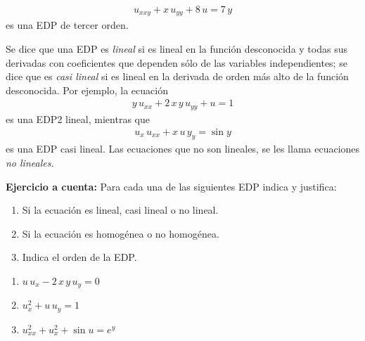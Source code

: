 \begin{align*}
u_{x x y} + x \, u_{y y} + 8 \, u = 7 \, y
\end{align*}
es una EDP de tercer orden.
\par
Se dice que una EDP es \emph{lineal} si es lineal en la función desconocida y todas sus derivadas con coeficientes que dependen sólo de las variables independientes; se dice que es \emph{casi lineal} si es lineal en la derivada de orden más alto de la función desconocida. Por ejemplo, la ecuación
\begin{align*}
y \, u_{xx} + 2 \, x \, y \, u_{yy} + u = 1
\end{align*}
es una EDP2 lineal, mientras que
\begin{align*}
u_{x} \, u_{x x} + x \, u \, y_{y} = \sin y
\end{align*}
es una EDP casi lineal. Las ecuaciones que no son lineales, se les llama ecuaciones \emph{no lineales.}
\par
\textbf{Ejercicio a cuenta: } Para cada una de las siguientes EDP indica y justifica:
\begin{enumerate}[label=\alph*)]
\item Si la ecuación es lineal, casi lineal o no lineal.
\item Si la ecuación es homogénea o no homogénea.
\item Indica el orden de la EDP.
\end{enumerate}
\begin{enumerate}[label=(\roman*)]
\item $u \, u_{x} - 2 \, x \, y \, u_{y} = 0$
\item $u_{x}^{2} + u \, u_{y} = 1$
\item $u_{xx}^{2} + u_{x}^{2} + \sin u =  e^{y}$
\end{enumerate}
